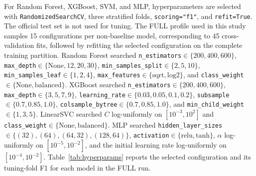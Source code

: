 \documentclass[conference]{IEEEtran}
\begin{document}
For Random Forest, XGBoost, SVM, and MLP, hyperparameters are selected with \texttt{RandomizedSearchCV}, three stratified folds, \texttt{scoring="f1"}, and \texttt{refit=True}. The official test set is not used for tuning. The FULL profile used in this study samples 15 configurations per non-baseline model, corresponding to 45 cross-validation fits, followed by refitting the selected configuration on the complete training partition. Random Forest searched \texttt{n\_estimators}$\in\{200,400,600\}$, \texttt{max\_depth}$\in\{\text{None},12,20,30\}$, \texttt{min\_samples\_split}$\in\{2,5,10\}$, \texttt{min\_samples\_leaf}$\in\{1,2,4\}$, \texttt{max\_features}$\in\{\text{sqrt},\text{log2}\}$, and \texttt{class\_weight}$\in\{\text{None},\text{balanced}\}$. XGBoost searched \texttt{n\_estimators}$\in\{200,400,600\}$, \texttt{max\_depth}$\in\{3,5,7,9\}$, \texttt{learning\_rate}$\in\{0.03,0.05,0.1,0.2\}$, \texttt{subsample}$\in\{0.7,0.85,1.0\}$, \texttt{colsample\_bytree}$\in\{0.7,0.85,1.0\}$, and \texttt{min\_child\_weight}$\in\{1,3,5\}$. LinearSVC searched $C$ log-uniformly on $[10^{-3},10^{2}]$ and \texttt{class\_weight}$\in\{\text{None},\text{balanced}\}$. MLP searched \texttt{hidden\_layer\_sizes}$\in\{(32),(64),(64,32),(128,64)\}$, \texttt{activation}$\in\{\text{relu},\text{tanh}\}$, $\alpha$ log-uniformly on $[10^{-5},10^{-2}]$, and the initial learning rate log-uniformly on $[10^{-4},10^{-2}]$. Table~\ref{tab:hyperparams} reports the selected configuration and its tuning-fold F1 for each model in the FULL run.

\begin{table}[htbp]
\caption{Selected hyperparameters after RandomizedSearchCV (FULL profile, 15 sampled configurations, three-fold tuning CV, F1 scoring)}
\label{tab:hyperparams}
\centering
{}
\end{table}
\end{document}
